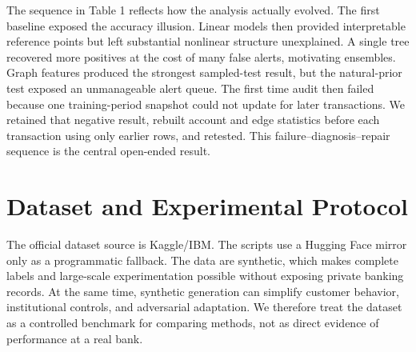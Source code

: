 \documentclass{article}
\begin{document}
\begin{table}[H]
\centering
\caption{Failure-driven experiment path.}
\end{table}

The sequence in Table 1 reflects how the analysis actually evolved. The first baseline exposed the accuracy illusion. Linear models then provided interpretable reference points but left substantial nonlinear structure unexplained. A single tree recovered more positives at the cost of many false alerts, motivating ensembles. Graph features produced the strongest sampled-test result, but the natural-prior test exposed an unmanageable alert queue. The first time audit then failed because one training-period snapshot could not update for later transactions. We retained that negative result, rebuilt account and edge statistics before each transaction using only earlier rows, and retested. This failure--diagnosis--repair sequence is the central open-ended result.

\section{Dataset and Experimental Protocol}
The official dataset source is Kaggle/IBM. The scripts use a Hugging Face mirror only as a programmatic fallback. The data are synthetic, which makes complete labels and large-scale experimentation possible without exposing private banking records. At the same time, synthetic generation can simplify customer behavior, institutional controls, and adversarial adaptation. We therefore treat the dataset as a controlled benchmark for comparing methods, not as direct evidence of performance at a real bank.
\end{document}
